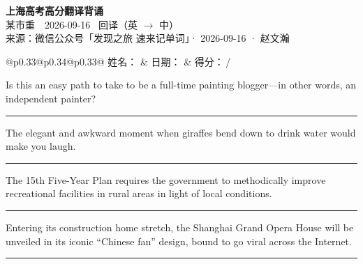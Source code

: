 \documentclass[11pt,a4paper]{article}
\newcommand{\num}[1]{\makebox[1.9em][r]{#1.}\hspace{0.3em}}
\newcommand{\wline}{\noindent\rule{\linewidth}{0.4pt}}
\begin{document}
\pagestyle{plain}
\begin{center}
{\LARGE\bfseries 上海高考高分翻译背诵 }\\[0.25em]
{\large 某市重　2026-09-16 \quad\ 回译（英 $\to$ 中）}\\[0.35em]
{\footnotesize 来源：微信公众号「发现之旅 速来记单词」· 2026-09-16 · 赵文瀚}
\end{center}

\vspace{0.4em}
\noindent\begin{tabular}{@{}p{0.33\textwidth}@{}p{0.34\textwidth}@{}p{0.33\textwidth}@{}}
姓名：\underline{\hspace{2.0cm}} & 日期：\underline{\hspace{2.0cm}} & 得分：\underline{\hspace{1.4cm}}\,/ \\
\end{tabular}

\vspace{0.5em}

\vspace{0.8em}
\num{1}Is this an easy path to take to be a full-time painting blogger—in other words, an independent painter?

\vspace{0.25em}

\wline

\num{2}The elegant and awkward moment when giraffes bend down to drink water would make you laugh.

\vspace{0.25em}

\wline

\num{3}The 15th Five-Year Plan requires the government to methodically improve recreational facilities in rural areas in light of local conditions.

\vspace{0.25em}

\wline

\num{4}Entering its construction home stretch, the Shanghai Grand Opera House will be unveiled in its iconic “Chinese fan” design, bound to go viral across the Internet.

\vspace{0.25em}

\wline
\end{document}

